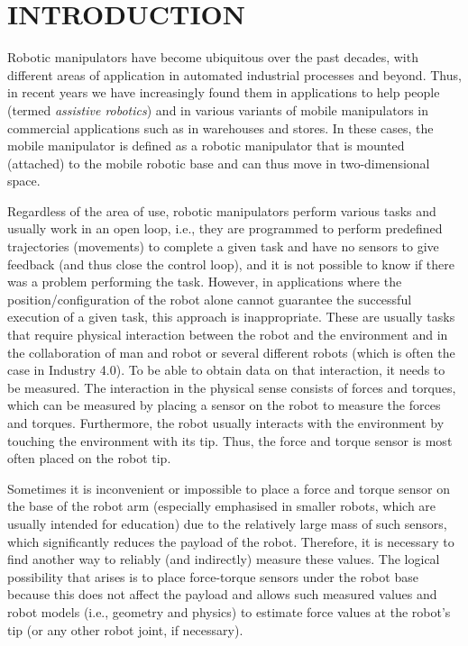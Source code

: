 \chapter{INTRODUCTION}
\label{chap:Intro}

Robotic manipulators have become ubiquitous over the past decades, with different areas of application in automated industrial processes and beyond. Thus, in recent years we have increasingly found them in applications to help people (termed \emph{assistive robotics}) and in various variants of mobile manipulators in commercial applications such as in warehouses and stores. In these cases, the mobile manipulator is defined as a robotic manipulator that is mounted (attached) to the mobile robotic base and can thus move in two-dimensional space.

Regardless of the area of use, robotic manipulators perform various tasks and usually work in an open loop, i.e., they are programmed to perform predefined trajectories (movements) to complete a given task and have no sensors to give feedback (and thus close the control loop), and it is not possible to know if there was a problem performing the task. However, in applications where the position/configuration of the robot alone cannot guarantee the successful execution of a given task, this approach is inappropriate. These are usually tasks that require physical interaction between the robot and the environment and in the collaboration of man and robot or several different robots (which is often the case in Industry 4.0). To be able to obtain data on that interaction, it needs to be measured. The interaction in the physical sense consists of forces and torques, which can be measured by placing a sensor on the robot to measure the forces and torques. Furthermore, the robot usually interacts with the environment by touching the environment with its tip. Thus, the force and torque sensor is most often placed on the robot tip.

Sometimes it is inconvenient or impossible to place a force and torque sensor on the base of the robot arm (especially emphasised in smaller robots, which are usually intended for education) due to the relatively large mass of such sensors, which significantly reduces the payload of the robot. Therefore, it is necessary to find another way to reliably (and indirectly) measure these values. The logical possibility that arises is to place force-torque sensors under the robot base because this does not affect the payload and allows such measured values and robot models (i.e., geometry and physics) to estimate force values at the robot's tip (or any other robot joint, if necessary).


